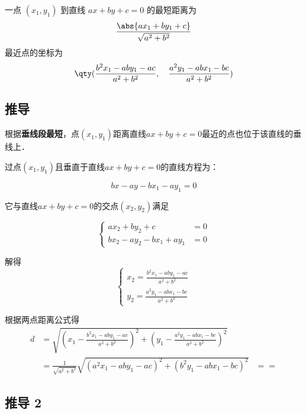 
\begin{issues}
\issueDraft
\end{issues}

一点 $(x_1,y_1)$ 到直线 $ax + by + c = 0$ 的最短距离为
\begin{equation}
\frac{\abs{ax_1 + by_1 + c}}{\sqrt{a^2 + b^2}}
\end{equation}
最近点的坐标为
\begin{equation}
\qty(
\frac{b^2x_1 - aby_1 - ac}{a^2 + b^2}, \quad
\frac{a^2y_1 - abx_1 - bc}{a^2 + b^2})
\end{equation}

\subsection{推导}

根据\textbf{垂线段最短}，点$(x_1, y_1)$距离直线$ax + by + c = 0$最近的点也位于该直线的垂线上．

过点$(x_1, y_1)$且垂直于直线$ax+by+c=0$的直线方程为：

\begin{equation}
bx - ay - bx_1 - ay_1 = 0
\end{equation}

它与直线$ax + by + c = 0$的交点$(x_2, y_2)$满足

\begin{equation}
\left\lbrace
\begin{aligned}
ax_2 + by_2 + c &= 0\\
bx_2 - ay_2-bx_1 + ay_1 &= 0
\end{aligned}
\right.
\end{equation}

解得
\begin{equation}
\left\lbrace
\begin{aligned}
x_2=\frac{b^2x_1 - aby_1 - ac}{a^2 + b^2}\\
y_2=\frac{a^2y_1 - abx_1 - bc}{a^2 + b^2}
\end{aligned}
\right.
\end{equation}

根据两点距离公式得
$$
\begin{split}
d&=\sqrt{(x_1-\frac{b^2x_1 - aby_1 - ac}{a^2 + b^2})^2+(y_1-\frac{a^2y_1 - abx_1 - bc}{a^2 + b^2})^2}\\
&=\frac{1}{\sqrt{a^2+b^2}}\sqrt{(a^2x_1 - aby_1 - ac)^2+(b^2y_1 - abx_1 - bc)^2}
&==
\end{split}
$$


\subsection{推导 2}



